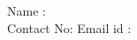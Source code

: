 \documentclass{article}
\newcommand{\VAR}[1]{}
\begin{document}
Name : \VAR{fname} \VAR{lname}\\
Contact No: \VAR{contact}
Email id : {\textbf{\VAR{email}}}

    
\end{document}
